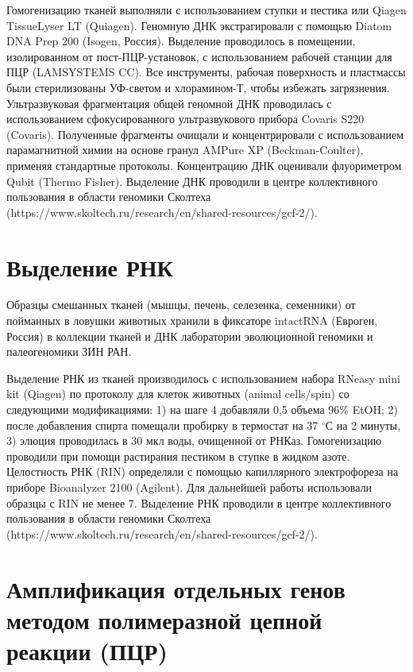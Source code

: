 Гомогенизацию тканей выполняли с использованием ступки и пестика или Qiagen TissueLyser LT (Quiagen). Геномную ДНК экстрагировали с помощью Diatom DNA Prep 200 (Isogen, Россия). Выделение проводилось в помещении, изолированном от пост-ПЦР-установок, с использованием рабочей станции для ПЦР (LAMSYSTEMS CC). Все инструменты, рабочая поверхность и пластмассы были стерилизованы УФ-светом и хлорамином-Т, чтобы избежать загрязнения. Ультразвуковая фрагментация общей геномной ДНК проводилась с использованием сфокусированного ультразвукового прибора Covaris S220 (Covaris). Полученные фрагменты очищали и концентрировали с использованием парамагнитной химии на основе гранул AMPure XP (Beckman-Coulter), применяя стандартные протоколы. Концентрацию ДНК оценивали флуориметром Qubit (Thermo Fisher). Выделение ДНК проводили в центре коллективного пользования в области геномики Сколтеха (https://www.skoltech.ru/research/en/shared-resources/gcf-2/). 

\section{Выделение РНК}

Образцы смешанных тканей (мышцы, печень, селезенка, семенники) от пойманных в ловушки животных хранили в фиксаторе intactRNA (Евроген, Россия) в коллекции тканей и ДНК лаборатории эволюционной геномики и палеогеномики  ЗИН РАН. 

Выделение РНК из тканей производилось с использованием набора RNeasy mini kit (Qiagen) по протоколу для клеток животных (animal cells/spin) со следующими модификациями: 1) на шаге 4 добавляли 0,5 объема 96\% EtOH; 2) после добавления спирта помещали пробирку в термостат на 37 $^\circ$С на 2 минуты, 3) элюция проводилась в 30 мкл воды, очищенной от РНКаз. Гомогенизацию проводили при помощи растирания пестиком в ступке в жидком азоте. Целостность РНК (RIN) определяли с помощью капиллярного электрофореза на приборе Bioanalyzer 2100 (Agilent). Для дальнейшей работы использовали образцы с RIN не менее 7. Выделение РНК проводили в центре коллективного пользования в области геномики Сколтеха (https://www.skoltech.ru/research/en/shared-resources/gcf-2/).

\section{Амплификация отдельных генов методом полимеразной цепной реакции (ПЦР)}

